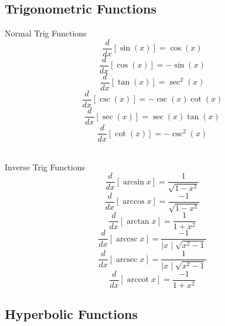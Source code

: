 \documentclass[12pt]{article}
\numberwithin{equation}{subsection}
\newcommand{\sinp}[1]{\sin\left( #1 \right)}
\newcommand{\cosp}[1]{\cos\left( #1 \right)}
\newcommand{\tanp}[1]{\tan\left( #1 \right)}
\newcommand{\secp}[1]{\sec\left( #1 \right)}
\newcommand{\cscp}[1]{\csc\left( #1 \right)}
\newcommand{\cotp}[1]{\cot\left( #1 \right)}
\DeclareMathOperator{\arcsec}{arcsec}
\DeclareMathOperator{\arccot}{arccot}
\DeclareMathOperator{\arccsc}{arccsc}
\begin{document}
\begin{flushleft}
\newpage


\subsection{Trigonometric Functions}
Normal Trig Functions
\begin{equation}
\frac{d}{dx}[\sinp{x}]=\cosp{x}
\end{equation}
\begin{equation}
\frac{d}{dx}[\cosp{x}]=-\sinp{x}
\end{equation}
\begin{equation}
\frac{d}{dx}[\tanp{x}]=\sec^{2}\left( x \right)
\end{equation}
\begin{equation}
\frac{d}{dx}[\cscp{x} ]= -\cscp{x} \cotp{x}
\end{equation}
\begin{equation}
\frac{d}{dx}[\secp{x} ]= \secp{x} \tanp{x}
\end{equation}
\begin{equation}
\frac{d}{dx}[\cotp{x} ]= -\csc^{2}\left( x \right)
\end{equation}\\
\bigskip 


Inverse Trig Functions
\begin{equation}
\frac{d}{dx}[\arcsin{x}]=\frac{1}{\sqrt{1-x^{2}}}
\end{equation}
\begin{equation}
\frac{d}{dx}[\arccos{x}]=\frac{-1}{\sqrt{1-x^{2}}}
\end{equation}
\begin{equation}
\frac{d}{dx}[\arctan{x}]=\frac{1}{1+x^{2}}
\end{equation}
\begin{equation}
\frac{d}{dx}[\arccsc{x}]=\frac{-1}{ \mid x \mid \sqrt{x^{2}-1}}
\end{equation}
\begin{equation}
\frac{d}{dx}[\arcsec{x}]=\frac{1}{ \mid x \mid \sqrt{x^{2}-1}}
\end{equation}
\begin{equation}
\frac{d}{dx}[\arccot{x}]=\frac{-1}{1+x^{2}}
\end{equation}

\newpage

\subsection{Hyperbolic Functions}


\end{flushleft}
\end{document}
